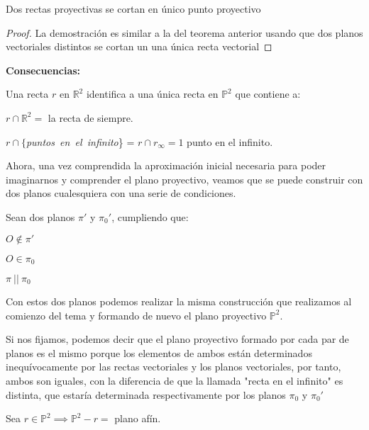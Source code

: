 \begin{nth}
Dos rectas proyectivas se cortan en único  punto proyectivo
\end{nth}
\begin{proof}
La demostración es similar a la del teorema anterior usando que dos planos vectoriales distintos se cortan un una única recta vectorial
\end{proof}

\textbf{Consecuencias:}

Una recta $r$ en $\mathbb{R}^2$ identifica a una única recta en $\mathbb{P}^2$ que contiene a:
\begin{nlist}

	\item $r \cap \mathbb{R}^2 =$ la recta de siempre.
	\item $r \cap \{$\textit{puntos\ en\ el\ infinito}\} = $r \cap r_\infty = 1$ punto en el infinito.

\end{nlist}

Ahora, una vez comprendida la aproximación inicial necesaria para poder imaginarnos y comprender el plano proyectivo, veamos que se puede construir con dos planos cualesquiera con una serie de condiciones.


Sean dos planos $\pi'$ y $\pi_0'$, cumpliendo que:
\begin{nlist}
	\item $O \notin \pi'$
	\item $O \in \pi_0$
	\item $\pi\ ||\ \pi_0$
\end{nlist}
Con estos dos planos podemos realizar la misma construcción que realizamos al comienzo del tema y formando de nuevo el plano proyectivo $\mathbb{P}^2$.

Si nos fijamos, podemos decir que el plano proyectivo formado por cada par de planos es el mismo porque los elementos de ambos están determinados inequívocamente por las rectas vectoriales y los planos vectoriales, por tanto, ambos son iguales, con la diferencia de que la llamada "recta en el infinito" es distinta, que estaría determinada respectivamente por los planos $\pi_0$ y $\pi_0'$

\begin{nprop}
Sea $r \in \mathbb{P}^2 \implies \mathbb{P}^2 - r =$ plano afín.
\end{nprop}

